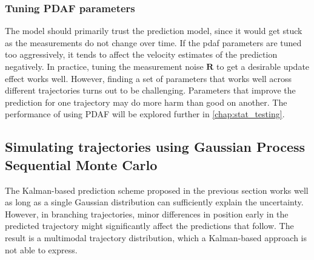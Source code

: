 \subsubsection{Tuning PDAF parameters}
The model should primarily trust the prediction model, since it would get stuck as the measurements do not change over time. If the \acrshort{pdaf} parameters are tuned too aggressively, it tends to affect the velocity estimates of the prediction negatively. In practice, tuning the measurement noise $\boldsymbol{R}$ to get a desirable update effect works well.
However, finding a set of parameters that works well across different trajectories turns out to be challenging. Parameters that improve the prediction for one trajectory may do more harm than good on another. The performance of using PDAF will be explored further in \cref{chap:stat_testing}.



\subsection{Simulating trajectories using Gaussian Process Sequential Monte Carlo}\label{sec:dyngp_particle}
The Kalman-based prediction scheme proposed in the previous section works well as long as a single Gaussian distribution can sufficiently explain the uncertainty. However, in branching trajectories, minor differences in position early in the predicted trajectory might significantly affect the predictions that follow. The result is a multimodal trajectory distribution, which a Kalman-based approach is not able to express.


